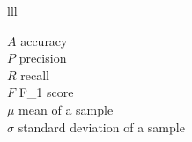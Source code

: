 \documentclass[
11pt, %
oneside, %
english, %
singlespacing, %
headsepline, %
]{MastersDoctoralThesis} %
\begin{document}
\begin{symbols}{lll} %

$A$ accuracy \\
$P$ precision \\ 
$R$ recall \\
$F$ F\_1 score \\
$\mu$ mean of a sample \\ 
$\sigma$ standard deviation of a sample \\



\end{symbols}




\mainmatter %

\pagestyle{thesis} %



 

 
 
 
 

\end{document}
